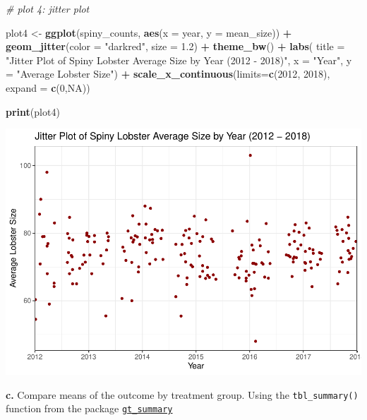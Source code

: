 \documentclass[
]{article}
\newenvironment{Shaded}{\begin{snugshade}}{\end{snugshade}}
\newcommand{\AttributeTok}[1]{\textcolor[rgb]{0.13,0.29,0.53}{#1}}
\newcommand{\CommentTok}[1]{\textcolor[rgb]{0.56,0.35,0.01}{\textit{#1}}}
\newcommand{\ConstantTok}[1]{\textcolor[rgb]{0.56,0.35,0.01}{#1}}
\newcommand{\DecValTok}[1]{\textcolor[rgb]{0.00,0.00,0.81}{#1}}
\newcommand{\FloatTok}[1]{\textcolor[rgb]{0.00,0.00,0.81}{#1}}
\newcommand{\FunctionTok}[1]{\textcolor[rgb]{0.13,0.29,0.53}{\textbf{#1}}}
\newcommand{\NormalTok}[1]{#1}
\newcommand{\OtherTok}[1]{\textcolor[rgb]{0.56,0.35,0.01}{#1}}
\newcommand{\SpecialCharTok}[1]{\textcolor[rgb]{0.81,0.36,0.00}{\textbf{#1}}}
\newcommand{\StringTok}[1]{\textcolor[rgb]{0.31,0.60,0.02}{#1}}
\begin{document}
\begin{Shaded}
\begin{Highlighting}[]
\CommentTok{\# plot 4: jitter plot}

\NormalTok{plot4 }\OtherTok{\textless{}{-}} \FunctionTok{ggplot}\NormalTok{(spiny\_counts, }\FunctionTok{aes}\NormalTok{(}\AttributeTok{x =}\NormalTok{ year, }\AttributeTok{y =}\NormalTok{ mean\_size)) }\SpecialCharTok{+}
    \FunctionTok{geom\_jitter}\NormalTok{(}\AttributeTok{color =} \StringTok{"darkred"}\NormalTok{, }\AttributeTok{size =} \FloatTok{1.2}\NormalTok{) }\SpecialCharTok{+}
    \FunctionTok{theme\_bw}\NormalTok{() }\SpecialCharTok{+}
    \FunctionTok{labs}\NormalTok{(}
        \AttributeTok{title =} \StringTok{"Jitter Plot of Spiny Lobster Average Size by Year (2012 {-} 2018)"}\NormalTok{,}
        \AttributeTok{x =} \StringTok{"Year"}\NormalTok{,}
        \AttributeTok{y =} \StringTok{"Average Lobster Size"}\NormalTok{) }\SpecialCharTok{+}
     \FunctionTok{scale\_x\_continuous}\NormalTok{(}\AttributeTok{limits=}\FunctionTok{c}\NormalTok{(}\DecValTok{2012}\NormalTok{, }\DecValTok{2018}\NormalTok{), }\AttributeTok{expand =} \FunctionTok{c}\NormalTok{(}\DecValTok{0}\NormalTok{,}\ConstantTok{NA}\NormalTok{))}
    

\FunctionTok{print}\NormalTok{(plot4)}
\end{Highlighting}
\end{Shaded}

\includegraphics{hw1-lobstrs-eds241_files/figure-latex/unnamed-chunk-5-4.pdf}

\textbf{c.} Compare means of the outcome by treatment group. Using the
\texttt{tbl\_summary()} function from the package
\href{https://www.danieldsjoberg.com/gtsummary/articles/tbl_summary.html}{\texttt{gt\_summary}}
\end{document}
